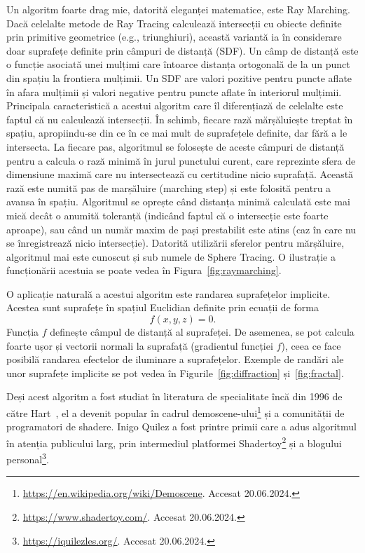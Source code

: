 \documentclass[12pt,a4paper]{report}
\numberwithin{equation}{section} %
\begin{document}
Un algoritm foarte drag mie, datorită eleganței matematice, este Ray Marching.
Dacă celelalte metode de Ray Tracing calculează intersecții cu obiecte definite
prin primitive geometrice (e.g., triunghiuri), această variantă ia în considerare
doar suprafețe definite prin câmpuri de distanță (SDF). Un câmp de distanță este
o funcție asociată unei mulțimi care întoarce distanța ortogonală de la un punct
din spațiu la frontiera mulțimii. Un SDF are valori pozitive pentru puncte aflate
în afara mulțimii și valori negative pentru puncte aflate în interiorul mulțimii.
Principala caracteristică a acestui algoritm
care îl diferențiază de celelalte este faptul că nu calculează intersecții.
În schimb, fiecare rază mărșăluiește treptat în spațiu, apropiindu-se din ce în ce mai mult
de suprafețele definite, dar fără a le intersecta.
La fiecare pas, algoritmul se folosește de aceste câmpuri de distanță pentru a
calcula o rază minimă în jurul punctului curent, care reprezinte sfera de dimensiune
maximă care nu intersectează cu certitudine nicio suprafață. Această rază este
numită pas de marșăluire (marching step) și este folosită pentru a avansa
în spațiu. Algoritmul se oprește când distanța minimă calculată este mai mică
decât o anumită toleranță (indicând faptul că o intersecție este foarte aproape),
sau când un număr maxim de pași prestabilit este atins (caz în care nu se înregistrează nicio intersecție).
Datorită utilizării sferelor pentru mărșăluire, algoritmul mai este cunoscut și
sub numele de Sphere Tracing.
O ilustrație a funcționării acestuia se poate vedea în Figura~\ref{fig:raymarching}.

O aplicație naturală a acestui algoritm este randarea suprafețelor implicite.
Acestea sunt suprafețe în spațiul Euclidian definite prin ecuații de forma
\begin{equation}
	f(x, y, z) = 0.
\end{equation}
Funcția $f$ definește câmpul de distanță al suprafeței. De asemenea, se pot
calcula foarte ușor și vectorii normali la suprafață (gradientul funcției $f$),
ceea ce face posibilă randarea efectelor de iluminare a suprafețelor.
Exemple de randări ale unor suprafețe implicite se pot vedea în Figurile~\ref{fig:diffraction}
și~\ref{fig:fractal}.

Deși acest algoritm a fost studiat în literatura de specialitate încă din 1996 de către Hart~\cite{hart1996sphere},
el a devenit popular în cadrul demoscene-ului\footnote{\url{https://en.wikipedia.org/wiki/Demoscene}. Accesat 20.06.2024.}
și a comunității de programatori de shadere. Inigo Quilez a fost printre primii
care a adus algoritmul în atenția publicului larg, prin intermediul platformei
Shadertoy\footnote{\url{https://www.shadertoy.com/}. Accesat 20.06.2024.}
și a blogului personal\footnote{\url{https://iquilezles.org/}. Accesat 20.06.2024.}.
\end{document}
